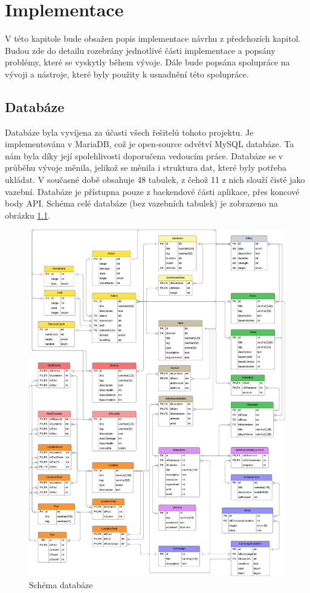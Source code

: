 \chapter{Implementace}
V této kapitole bude obsažen popis implementace návrhu z předchozích kapitol. Budou zde do detailu rozebrány jednotlivé části implementace a popsány problémy, které se vyskytly během vývoje. Dále bude popsána spolupráce na vývoji a nástroje, které byly použity k usnadnění této spolupráce.

\section{Databáze}
Databáze byla vyvíjena za účasti všech řešitelů tohoto projektu. Je implementována v MariaDB, což je open-source odvětví MySQL databáze. Ta nám byla díky její spolehlivosti doporučena vedoucím práce. Databáze se v průběhu vývoje měnila, jelikož se měnila i struktura dat, které byly potřeba ukládat. V současné době obsahuje 48 tabulek, z čehož 11 z nich slouží čistě jako vazební. Databáze je přístupna pouze z backendové části aplikace, přes koncové body API. Schéma celé databáze (bez vazebních tabulek) je zobrazeno na obrázku \ref{fig:db_schema}.

\begin{figure}[htbp]
  \centering
  \includegraphics[width=.95\textwidth]{../../shared/diagrams/dbScheme.pdf}
  \caption{Schéma databáze}
  \label{fig:db_schema}
\end{figure}

